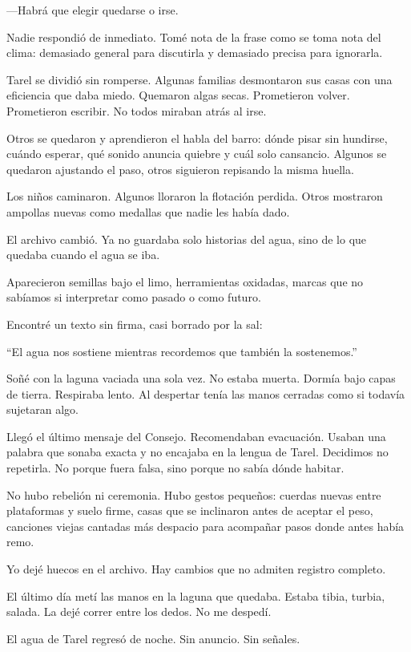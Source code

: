 —Habrá que elegir quedarse o irse.

Nadie respondió de inmediato. Tomé nota de la frase como se toma nota del clima: demasiado general para discutirla y demasiado precisa para ignorarla.

Tarel se dividió sin romperse. Algunas familias desmontaron sus casas con una eficiencia que daba miedo. Quemaron algas secas. Prometieron volver. Prometieron escribir. No todos miraban atrás al irse.

Otros se quedaron y aprendieron el habla del barro: dónde pisar sin hundirse, cuándo esperar, qué sonido anuncia quiebre y cuál solo cansancio. Algunos se quedaron ajustando el paso, otros siguieron repisando la misma huella.

Los niños caminaron. Algunos lloraron la flotación perdida. Otros mostraron ampollas nuevas como medallas que nadie les había dado.

El archivo cambió. Ya no guardaba solo historias del agua, sino de lo que quedaba cuando el agua se iba.

Aparecieron semillas bajo el limo, herramientas oxidadas, marcas que no sabíamos si interpretar como pasado o como futuro.

Encontré un texto sin firma, casi borrado por la sal:

\begin{cita}
“El agua nos sostiene mientras recordemos que también la sostenemos.”
\end{cita}
Soñé con la laguna vaciada una sola vez. No estaba muerta. Dormía bajo capas de tierra. Respiraba lento. Al despertar tenía las manos cerradas como si todavía sujetaran algo.

Llegó el último mensaje del Consejo. Recomendaban evacuación. Usaban una palabra que sonaba exacta y no encajaba en la lengua de Tarel. Decidimos no repetirla. No porque fuera falsa, sino porque no sabía dónde habitar.

No hubo rebelión ni ceremonia. Hubo gestos pequeños: cuerdas nuevas entre plataformas y suelo firme, casas que se inclinaron antes de aceptar el peso, canciones viejas cantadas más despacio para acompañar pasos donde antes había remo.

Yo dejé huecos en el archivo. Hay cambios que no admiten registro completo.

El último día metí las manos en la laguna que quedaba. Estaba tibia, turbia, salada. La dejé correr entre los dedos. No me despedí.

El agua de Tarel regresó de noche. Sin anuncio. Sin señales.

